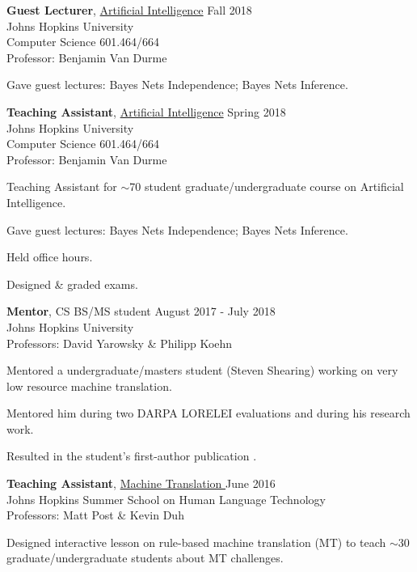 \documentclass[margin,line,hyperref,color]{res}
\newenvironment{packed_itemize}{
\begin{itemize}[leftmargin=1.5em]
  \setlength{\itemsep}{0pt}
  \setlength{\parskip}{0pt}
  \setlength{\parsep}{0pt}
}{\end{itemize}}
\begin{document}
\begin{resume}
\textbf{Guest Lecturer}, \href{http://www.cs.jhu.edu/~huda/classes/AIFall2018.pdf}{Artificial Intelligence}
  \hfill Fall 2018\\
  Johns Hopkins University\\
   Computer Science 601.464/664\\
  Professor: Benjamin Van Durme
    \begin{packed_itemize}
\item Gave guest lectures: Bayes Nets Independence; Bayes Nets Inference.
\end{packed_itemize}

\textbf{Teaching Assistant},  \href{http://www.cs.jhu.edu/~huda/classes/AISpring2018.pdf}{Artificial Intelligence}
  \hfill Spring 2018\\
  Johns Hopkins University\\
   Computer Science 601.464/664\\
  Professor: Benjamin Van Durme
      \begin{packed_itemize}

\item Teaching Assistant for $\sim$70 student graduate/undergraduate course on Artificial Intelligence.
\item Gave guest lectures: Bayes Nets Independence; Bayes Nets Inference.
\item Held office hours.
\item Designed \& graded exams. 
\end{packed_itemize}


\textbf{Mentor},  CS BS/MS student 
  \hfill August 2017 - July 2018 \\
  Johns Hopkins University\\
  Professors: David Yarowsky \& Philipp Koehn    
   \begin{packed_itemize}
\item Mentored a  undergraduate/masters student (Steven Shearing) working on very 
low resource machine translation. 
\item Mentored him during two DARPA LORELEI evaluations and during his research work. 
 \item Resulted in the student's first-author publication \citep{Shearing+2018AMTA}. 
 \end{packed_itemize}


\textbf{Teaching Assistant},  \href{https://tinyurl.com/mt-16-clsp}{Machine Translation }
  \hfill June 2016\\
  Johns Hopkins Summer School on Human Language Technology\\
    Professors: Matt Post \& Kevin Duh
      \begin{packed_itemize}
\item Designed interactive lesson on rule-based machine translation (MT) to teach $\sim$30 graduate/undergraduate  students about MT challenges.
\end{packed_itemize}



\end{resume}
\end{document}
